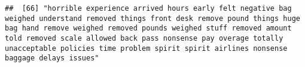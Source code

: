 \documentclass[
]{article}
\begin{document}
\begin{verbatim}
##  [66] "horrible experience arrived hours early felt negative bag weighed understand removed things front desk remove pound things huge bag hand remove weighed removed pounds weighed stuff removed amount told removed scale allowed back pass nonsense pay overage totally unacceptable policies time problem spirit spirit airlines nonsense baggage delays issues"                                                                                                                                                                                                                                                                                                                                                                                                                                                                                                                                                                                                                                                                                                                                                                                                                                                                                                                                                                                                                                                                                                                                                                                                                                                                                                                                                                                                                                

\end{verbatim}
\end{document}
